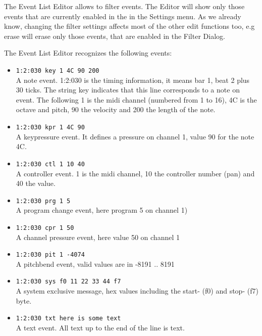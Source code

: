\documentclass[letterpaper]{report}
\begin{document}
The Event List Editor allows to filter events. The Editor will show only those
events that are currently enabled in the 
in the Settings menu. As we already know, changing the filter settings
affects most of the other edit functions too, e.g erase will erase only
those events, that are enabled in the Filter Dialog.

The Event List Editor recognizes the following events:

\begin{itemize}
\item {\tt 1:2:030 key 1 4C 90 200}\\
      A note event. 1:2:030 is the timing information, it means bar 1,
      beat 2 plus 30 ticks. The string key indicates that this line
      corresponds to a note on event. The following 1 is the midi channel
      (numbered from 1 to 16), 4C is the octave and pitch, 90
      the velocity and 200 the length of the note.

\item {\tt 1:2:030 kpr 1 4C 90}\\
      A keypressure event. It defines a pressure on channel 1, value 90 for the note 4C.

\item {\tt 1:2:030 ctl 1 10 40}\\
        A controller event. 1 is the midi channel, 10 the controller number (pan) and
        40 the value.

\item {\tt 1:2:030 prg 1 5}\\
        A program change event, here program 5 on channel 1)

\item {\tt 1:2:030 cpr 1 50}\\
        A channel pressure event, here value 50 on channel 1

\item {\tt 1:2:030 pit 1 -4074}\\
        A pitchbend event, valid values are in -8191 .. 8191

\item {\tt 1:2:030 sys f0 11 22 33 44 f7}\\
        A system exclusive message, hex values including the start-
        (f0) and stop- (f7) byte.

\item {\tt 1:2:030 txt here is some text}\\
        A text event. All text up to the end of the line is text.


\end{itemize}
\end{document}
